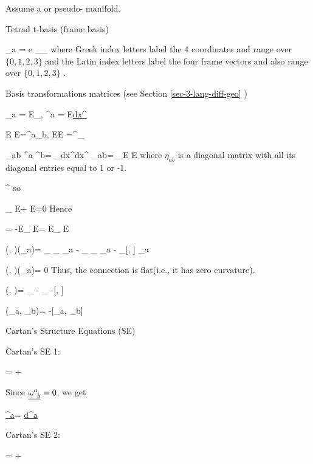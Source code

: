 Assume a \Rien or pseudo-\Rien
manifold.

Tetrad t-basis
(frame basis)

\beq
\vece_a = e
_{\vec{\partial}_\mu}
\eeq
where Greek index letters label the 4 coordinates and range over $\{0,1,2,3\}$
and the Latin index letters label the four frame vectors
and also range over $\{0,1,2,3\}$
.

Basis transformations
matrices (see Section \ref{sec-3-lang-diff-geo}
)

\beq
\vece_a = E\vecpartial_\mu,\quad
\chi^a =
E\ul{dx^\mu} 
\eeq

\beq
E
E=\delta^a_b,\quad
EE
=\delta^\nu_\mu
\eeq


\beq
\eta_{ab} \chi^a \;\chi^b=
\metric_{\mu\nu}dx^\mu\;dx^\nu\implies
\eta_{ab}=\metric_{\mu\nu}
E
E
\eeq
where $\eta_{ab}$
is a diagonal
matrix with all its diagonal entries equal to 1 or -1.

\beq
[\nnabla_\mu e_a]^
\eeq
so

\beq
\partial_\mu
E+
\Gamma\indices{^\rho_{\mu\nu}}
E=0
\eeq
Hence

\beq
\Gamma\indices{^\rho_{\mu\nu}}=
-E\partial_\mu 
E=
E\partial_\mu 
E
\eeq

\beq
\RR(\vecX, \vecY)(\vece_a)=
\nnabla_\vecX
\nnabla_\vecY
\vece_a
-
\nnabla_\vecY
\nnabla_\vecX
\vece_a
-
\nnabla_{[\vecX, \vecY]}
\vece_a
\eeq

\beq
\RR(\vecX, \vecY)(\vece_a)= 0
\eeq
Thus, the \Weit 
connection
is flat(i.e., it has zero curvature).

\beq
\TT(\vecX, \vecY)=
\nnabla_\vecX \vecY
-
\nnabla_\vecY \vecX
-[\vecX, \vecY]
\eeq

\beq
\TT(\vece_a, \vece_b)=
-[\vece_a, \vece_b]
\eeq

Cartan's Structure Equations (SE)

Cartan's  SE 1:

\beq
{}=
+
\wedge
{}
\eeq

Since $
\ul{\omega\indices{^a_b}}=0$,
we get 

\beq
\boxed
{\ul{\TT^a}=
\ul{d\chi^a}}
\eeq

Cartan's SE 2:

\beq
{}=
+
\wedge
{}
\eeq

